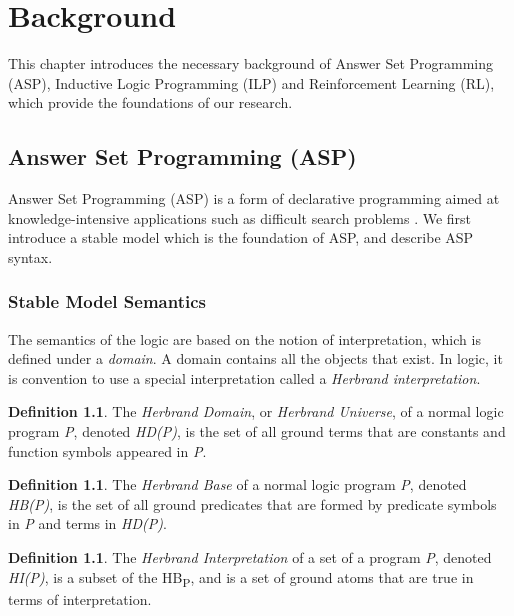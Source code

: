 \documentclass[11pt,twoside]{report}
\theoremstyle{plain}
\theoremstyle{definition}
\newtheorem{defn}[thm]{Definition} %
\begin{document}
\chapter{Background}
\label{background}

This chapter introduces the necessary background of Answer Set Programming (ASP), Inductive Logic Programming (ILP) and Reinforcement Learning (RL), which provide the foundations of our research.

\section{Answer Set Programming (ASP)}
\label{sec:asp}
Answer Set Programming (ASP) is a form of declarative programming aimed at knowledge-intensive applications such as difficult search problems \cite{Lifschitz2008}. 
We first introduce a stable model which is the foundation of ASP, and describe ASP syntax. 

\subsection{Stable Model Semantics}

The semantics of the logic are based on the notion of interpretation, which is defined under a \textit{domain}. A domain contains all the objects that exist. 
In logic, it is convention to use a special interpretation called a \textit{Herbrand interpretation}.

\begin{defn}
The \textit{Herbrand Domain}, or \textit{Herbrand Universe}, of a normal logic program \textit{P}, denoted \textit{HD(P)}, is the set of all ground terms that are constants and function symbols appeared in \textit{P}.
\end{defn}

\begin{defn}
The \textit{Herbrand Base} of a normal logic program \textit{P}, denoted \textit{HB(P)}, is the set of all ground predicates that are formed by predicate symbols in \textit{P} and terms in \textit{HD(P)}.
\end{defn}

\begin{defn}
The \textit{Herbrand Interpretation} of a set of a program \textit{P}, denoted \textit{HI(P)}, is a subset of the HB\textsubscript{P}, and is a set of ground atoms that are true in terms of interpretation.
\end{defn}
\end{document}

